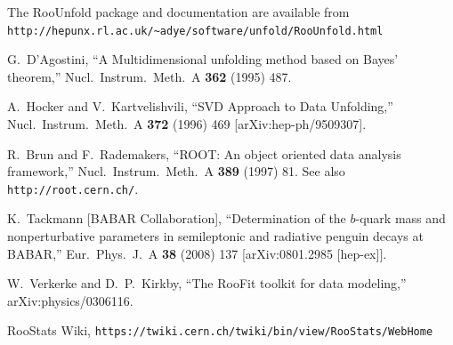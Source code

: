 \documentclass{desyproc}
\begin{document}
\begin{footnotesize}

\begin{thebibliography}{99}

  The RooUnfold package and documentation are available from\\
  \verb=http://hepunx.rl.ac.uk/~adye/software/unfold/RooUnfold.html=

  G.~D'Agostini,
  ``A Multidimensional unfolding method based on Bayes' theorem,''
  Nucl.\ Instrum.\ Meth.\  A {\bf 362} (1995) 487.

  A.~Hocker and V.~Kartvelishvili,
  ``SVD Approach to Data Unfolding,''
  Nucl.\ Instrum.\ Meth.\  A {\bf 372} (1996) 469
  [arXiv:hep-ph/9509307].

  R.~Brun and F.~Rademakers,
  ``ROOT: An object oriented data analysis framework,''
  Nucl.\ Instrum.\ Meth.\  A {\bf 389} (1997) 81.
  See also \verb=http://root.cern.ch/=.

  K.~Tackmann [BABAR Collaboration],
  ``Determination of the $b$-quark mass and nonperturbative parameters in semileptonic and radiative penguin decays at BABAR,''
  Eur.\ Phys.\ J.\  A {\bf 38} (2008) 137
  [arXiv:0801.2985 [hep-ex]].

  W.~Verkerke and D.~P.~Kirkby,
  ``The RooFit toolkit for data modeling,''
  arXiv:physics/0306116.

  RooStats Wiki,
  \verb=https://twiki.cern.ch/twiki/bin/view/RooStats/WebHome=

\end{thebibliography}

\end{footnotesize}

\end{document}
